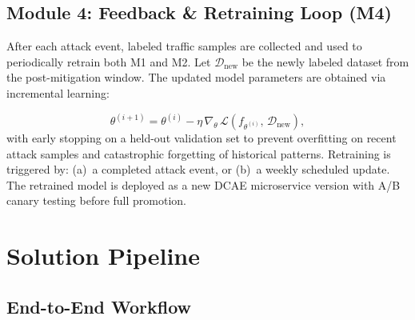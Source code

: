 \documentclass[12pt, a4paper]{article}
\begin{document}
\subsection{Module 4: Feedback \& Retraining Loop (M4)}

After each attack event, labeled traffic samples are collected and used to
periodically retrain both M1 and M2. Let $\mathcal{D}_{\mathrm{new}}$ be
the newly labeled dataset from the post-mitigation window. The updated model
parameters are obtained via incremental learning:

\begin{equation}
  \theta^{(i+1)} = \theta^{(i)} - \eta\,
  \nabla_\theta\,\mathcal{L}\!\left(f_{\theta^{(i)}},\, \mathcal{D}_{\mathrm{new}}\right),
  \label{eq:retrain}
\end{equation}
with early stopping on a held-out validation set to prevent overfitting on
recent attack samples and catastrophic forgetting of historical patterns.
Retraining is triggered by: (a)~a completed attack event, or (b)~a weekly
scheduled update. The retrained model is deployed as a new DCAE microservice
version with A/B canary testing before full promotion.

\section{Solution Pipeline}

\subsection{End-to-End Workflow}
\end{document}
